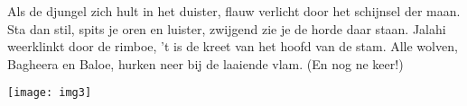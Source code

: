\beginverse*
Als de djungel zich hult in het duister, flauw verlicht door het schijnsel der maan.
Sta dan stil, spits je oren en luister, zwijgend zie je de horde daar staan. 
\endverse
\beginchorus
Jalahi weerklinkt door de rimboe, 't is de kreet van het hoofd van de stam.
Alle wolven, Bagheera en Baloe, hurken neer bij de laaiende vlam. 
(En nog ne keer!)
\endchorus
\endsong
\begin{intersong}
    \texttt{[image: img3]}
\end{intersong}